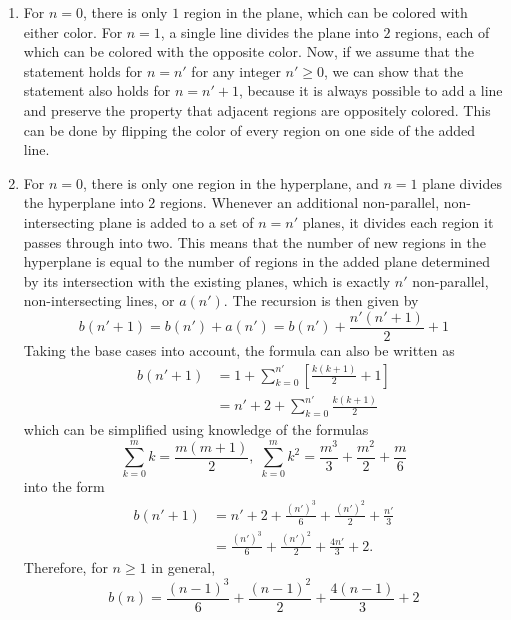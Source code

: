 \documentclass[a4paper,12pt]{article}
\begin{document}
\begin{enumerate}
\item For $n = 0$, there is only $1$ region in the plane, which can be colored with either color. For $n = 1$, a single line divides the plane into $2$ regions, each of which can be colored with the opposite color. Now, if we assume that the statement holds for $n = n'$ for any integer $n' \geq 0$, we can show that the statement also holds for $n = n' + 1$, because it is always possible to add a line and preserve the property that adjacent regions are oppositely colored. This can be done by flipping the color of every region on one side of the added line. \par

\item For $n = 0$, there is only one region in the hyperplane, and $n = 1$ plane divides the hyperplane into $2$ regions. Whenever an additional non-parallel, non-intersecting plane is added to a set of $n = n'$ planes, it divides each region it passes through into two. This means that the number of new regions in the hyperplane is equal to the number of regions in the added plane determined by its intersection with the existing planes, which is exactly $n'$ non-parallel, non-intersecting lines, or $a(n')$. The recursion is then given by
\[ b(n' + 1) = b(n') + a(n') = b(n') + \frac{n'(n' + 1)}{2} + 1 \]
Taking the base cases into account, the formula can also be written as
\begin{equation*}
\begin{split}
b(n' + 1) &= 1 + \sum_{k = 0} ^ {n'} \left[\frac{k(k + 1)}{2} + 1\right] \\
&= n' + 2 + \sum_{k = 0} ^ {n'} \frac{k(k + 1)}{2}
\end{split}
\end{equation*}
which can be simplified using knowledge of the formulas
\[ \sum_{k = 0} ^ {m} k = \frac{m(m + 1)}{2} ,\; \sum_{k = 0} ^ {m} k^2 = \frac{m^3}{3} + \frac{m^2}{2} + \frac{m}{6} \]
into the form
\begin{equation*}
\begin{split}
b(n' + 1) &= n' + 2 + \frac{(n')^3}{6} + \frac{(n')^2}{2} + \frac{n'}{3} \\
&= \frac{(n')^3}{6} + \frac{(n')^2}{2} + \frac{4n'}{3} + 2.
\end{split}
\end{equation*}
Therefore, for $n \geq 1$ in general,
\[ b(n) = \frac{(n - 1)^3}{6} + \frac{(n - 1)^2}{2} + \frac{4(n - 1)}{3} + 2 \]

\end{enumerate}
\end{document}
